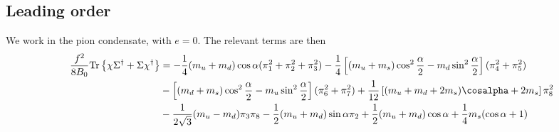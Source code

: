 \subsection{Leading order}


We work in the pion condensate, with $e = 0$.
The relevant terms are then
%
\begin{align}
    \nonumber
    \frac{f^2}{8B_0}\Tr{\chi \Sigma^\dagger + \Sigma \chi^\dagger}
    & =
    - \frac{1}{4}(m_u + m_d)\cos\alpha (\pi_1^2 + \pi_2^2 + \pi_3^2)
    - \frac{1}{4} 
    \left[
        (m_u + m_s)\cos^2\frac{\alpha}{2} - m_d \sin^2\frac{\alpha}{2}
    \right](\pi_4^2 + \pi_5^2)\\ \nonumber
    &- 
    \left[
        (m_d + m_s)\cos^2\frac{\alpha}{2} - m_u \sin^2\frac{\alpha}{2}
    \right](\pi_6^2 + \pi_7^2) 
    + \frac{1}{12} 
    \left[
        (m_u + m_d + 2m_s) \cosalpha + 2m_s
    \right] \pi_8^2 \\
    &-\frac{1}{2 \sqrt{3}} (m_u - m_d) \pi_3 \pi_8
    - \frac{1}{2}(m_u + m_d)\sin\alpha \pi_2
    + \frac{1}{2}(m_u + m_d)\cos\alpha + \frac{1}{4}m_s(\cos\alpha + 1)
\end{align}

